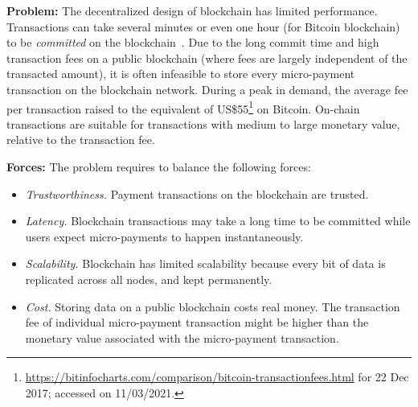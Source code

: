 \vspace{0.5em}\noindent \textbf{Problem:} 
The decentralized design of blockchain has limited performance. Transactions can take several minutes or even one hour (for Bitcoin blockchain) to be \emph{committed} on the blockchain~\cite{SRDS2017}. Due to the long commit time and high transaction fees on a public blockchain (where fees are largely independent of the transacted amount), it is often infeasible to store every micro-payment transaction on the blockchain network.
During a peak in demand, the average fee per transaction raised to the equivalent of US\$55\footnote{ \url{https://bitinfocharts.com/comparison/bitcoin-transactionfees.html} for 22 Dec 2017; accessed on 11/03/2021.} on Bitcoin. On-chain transactions are suitable for transactions with medium to large monetary value, relative to the transaction fee.


\vspace{0.5em}\noindent \textbf{Forces:} The problem requires to balance the following forces:
\begin{itemize}
  \item \textit{Trustworthiness.} Payment transactions on the blockchain are trusted.
  \item \textit{Latency.} Blockchain transactions may take a long time to be committed while users expect micro-payments to happen instantaneously.
  \item \textit{Scalability.} Blockchain has limited scalability because every bit of data is replicated across all nodes, and kept permanently.
  \item \textit{Cost.} Storing data on a public blockchain costs real money. The transaction fee of individual micro-payment transaction might be higher than the monetary value associated with the micro-payment transaction.
\end{itemize}

